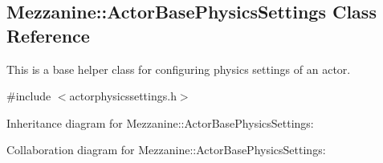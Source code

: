\hypertarget{classMezzanine_1_1ActorBasePhysicsSettings}{\subsection{Mezzanine\-:\-:Actor\-Base\-Physics\-Settings Class Reference}
\label{classMezzanine_1_1ActorBasePhysicsSettings}
}


This is a base helper class for configuring physics settings of an actor.  




{\ttfamily \#include $<$actorphysicssettings.\-h$>$}



Inheritance diagram for Mezzanine\-:\-:Actor\-Base\-Physics\-Settings\-:


Collaboration diagram for Mezzanine\-:\-:Actor\-Base\-Physics\-Settings\-:
